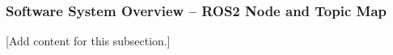 
\subsubsection{Software System Overview -- ROS2 Node and Topic Map}
\label{subsubsec:design_2_5_1_software_system_overview}

[Add content for this subsection.]
